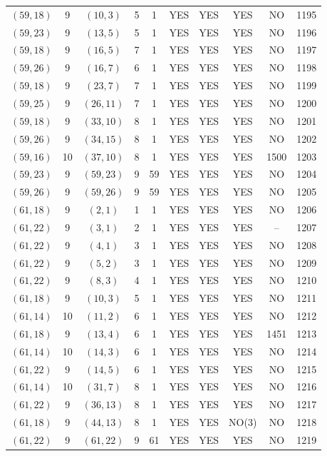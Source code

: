 \begin{longtable}{|c|c|c|c|c|c|c|c|c|c|}
$(59, 18)$ & 9 & $(10, 3)$ & 5 & 1 & YES & YES & YES & NO & 1195\\
$(59, 23)$ & 9 & $(13, 5)$ & 5 & 1 & YES & YES & YES & NO & 1196\\
$(59, 18)$ & 9 & $(16, 5)$ & 7 & 1 & YES & YES & YES & NO & 1197\\
$(59, 26)$ & 9 & $(16, 7)$ & 6 & 1 & YES & YES & YES & NO & 1198\\
$(59, 18)$ & 9 & $(23, 7)$ & 7 & 1 & YES & YES & YES & NO & 1199\\
$(59, 25)$ & 9 & $(26, 11)$ & 7 & 1 & YES & YES & YES & NO & 1200\\
$(59, 18)$ & 9 & $(33, 10)$ & 8 & 1 & YES & YES & YES & NO & 1201\\
$(59, 26)$ & 9 & $(34, 15)$ & 8 & 1 & YES & YES & YES & NO & 1202\\
$(59, 16)$ & 10 & $(37, 10)$ & 8 & 1 & YES & YES & YES & 1500 & 1203\\
$(59, 23)$ & 9 & $(59, 23)$ & 9 & 59 & YES & YES & YES & NO & 1204\\
$(59, 26)$ & 9 & $(59, 26)$ & 9 & 59 & YES & YES & YES & NO & 1205\\
$(61, 18)$ & 9 & $(2, 1)$ & 1 & 1 & YES & YES & YES & NO & 1206\\
$(61, 22)$ & 9 & $(3, 1)$ & 2 & 1 & YES & YES & YES & -- & 1207\\
$(61, 22)$ & 9 & $(4, 1)$ & 3 & 1 & YES & YES & YES & NO & 1208\\
$(61, 22)$ & 9 & $(5, 2)$ & 3 & 1 & YES & YES & YES & NO & 1209\\
$(61, 22)$ & 9 & $(8, 3)$ & 4 & 1 & YES & YES & YES & NO & 1210\\
$(61, 18)$ & 9 & $(10, 3)$ & 5 & 1 & YES & YES & YES & NO & 1211\\
$(61, 14)$ & 10 & $(11, 2)$ & 6 & 1 & YES & YES & YES & NO & 1212\\
$(61, 18)$ & 9 & $(13, 4)$ & 6 & 1 & YES & YES & YES & 1451 & 1213\\
$(61, 14)$ & 10 & $(14, 3)$ & 6 & 1 & YES & YES & YES & NO & 1214\\
$(61, 22)$ & 9 & $(14, 5)$ & 6 & 1 & YES & YES & YES & NO & 1215\\
$(61, 14)$ & 10 & $(31, 7)$ & 8 & 1 & YES & YES & YES & NO & 1216\\
$(61, 22)$ & 9 & $(36, 13)$ & 8 & 1 & YES & YES & YES & NO & 1217\\
$(61, 18)$ & 9 & $(44, 13)$ & 8 & 1 & YES & YES & NO(3) & NO & 1218\\
$(61, 22)$ & 9 & $(61, 22)$ & 9 & 61 & YES & YES & YES & NO & 1219\\

\end{longtable}
